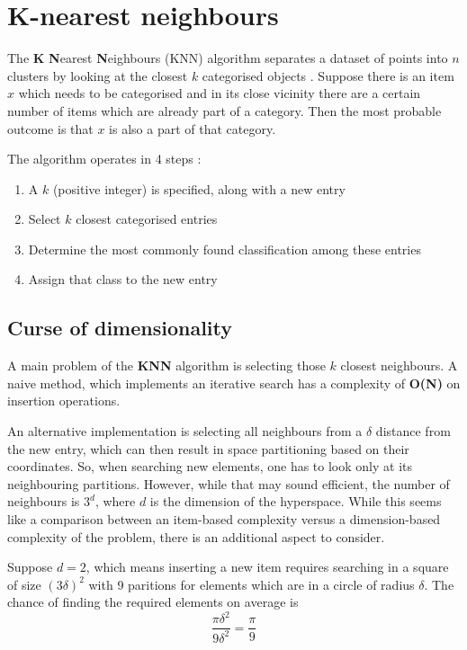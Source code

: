 \section{K-nearest neighbours}
\label{sec:cluster_knn}

The \textbf{K} \textbf{N}earest \textbf{N}eighbours (KNN) algorithm separates a dataset of points into $n$ clusters by looking at the closest $k$ categorised objects \cite{knn}. Suppose there is an item $x$ which needs to be categorised and in its close vicinity there are a certain number of items which are already part of a category. Then the most probable outcome is that $x$ is also a part of that category.

The algorithm operates in 4 steps \cite{knn}:

\begin{enumerate}
\item{A $k$ (positive integer) is specified, along with a new entry}
\item{Select $k$ closest categorised entries}
\item{Determine the most commonly found classification among these entries}
\item{Assign that class to the new entry}
\end{enumerate}

\subsection{Curse of dimensionality}
\label{subsec:cluster_knn_curse}

A main problem of the \textbf{KNN} algorithm is selecting those $k$ closest neighbours. A naive method, which implements an iterative search has a complexity of \textbf{O(N)} on insertion operations. 

An alternative implementation is selecting all neighbours from a $\delta$ distance from the new entry, which can then result in space partitioning based on their coordinates. So, when searching new elements, one has to look only at its neighbouring partitions. However, while that may sound efficient, the number of neighbours is $3^d$, where $d$ is the dimension of the hyperspace. While this seems like a comparison between an item-based complexity versus a dimension-based complexity of the problem, there is an additional aspect to consider. 

Suppose $d=2$, which means inserting a new item requires searching in a square of size $(3\delta)^2$ with 9 paritions for elements which are in a circle of radius $\delta$. The chance of finding the required elements on average is 
\[ \frac{\pi \delta^2}{9 \delta ^ 2} = \frac{\pi}{9} \]

